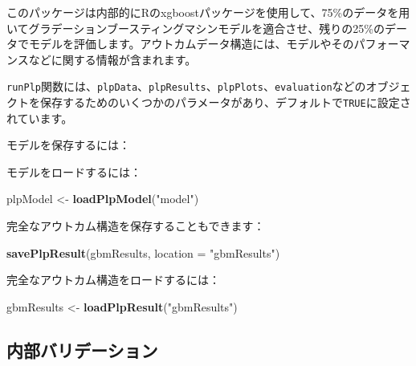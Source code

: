 \documentclass[
  11pt]{book}
\newenvironment{Shaded}{\begin{snugshade}}{\end{snugshade}}
\newcommand{\AttributeTok}[1]{\textcolor[rgb]{0.13,0.29,0.53}{#1}}
\newcommand{\FunctionTok}[1]{\textcolor[rgb]{0.13,0.29,0.53}{\textbf{#1}}}
\newcommand{\NormalTok}[1]{#1}
\newcommand{\OtherTok}[1]{\textcolor[rgb]{0.56,0.35,0.01}{#1}}
\newcommand{\SpecialCharTok}[1]{\textcolor[rgb]{0.81,0.36,0.00}{\textbf{#1}}}
\newcommand{\StringTok}[1]{\textcolor[rgb]{0.31,0.60,0.02}{#1}}
\theoremstyle{definition}
\theoremstyle{definition}
\theoremstyle{definition}
\theoremstyle{definition}
\theoremstyle{remark}
\begin{document}
このパッケージは内部的にRのxgboostパッケージを使用して、75\%のデータを用いてグラデーションブースティングマシンモデルを適合させ、残りの25\%のデータでモデルを評価します。アウトカムデータ構造には、モデルやそのパフォーマンスなどに関する情報が含まれます。

\texttt{runPlp}関数には、\texttt{plpData}、\texttt{plpResults}、\texttt{plpPlots}、\texttt{evaluation}などのオブジェクトを保存するためのいくつかのパラメータがあり、デフォルトで\texttt{TRUE}に設定されています。

モデルを保存するには：

\begin{Shaded}
\end{Shaded}

モデルをロードするには：

\begin{Shaded}
\begin{Highlighting}[]
\NormalTok{plpModel }\OtherTok{\textless{}{-}} \FunctionTok{loadPlpModel}\NormalTok{(}\StringTok{"model"}\NormalTok{)}
\end{Highlighting}
\end{Shaded}

完全なアウトカム構造を保存することもできます：

\begin{Shaded}
\begin{Highlighting}[]
\FunctionTok{savePlpResult}\NormalTok{(gbmResults, }\AttributeTok{location =} \StringTok{"gbmResults"}\NormalTok{)}
\end{Highlighting}
\end{Shaded}

完全なアウトカム構造をロードするには：

\begin{Shaded}
\begin{Highlighting}[]
\NormalTok{gbmResults }\OtherTok{\textless{}{-}} \FunctionTok{loadPlpResult}\NormalTok{(}\StringTok{"gbmResults"}\NormalTok{)}
\end{Highlighting}
\end{Shaded}

\subsection{内部バリデーション}\label{ux5185ux90e8ux30d0ux30eaux30c7ux30fcux30b7ux30e7ux30f3}
\end{document}
